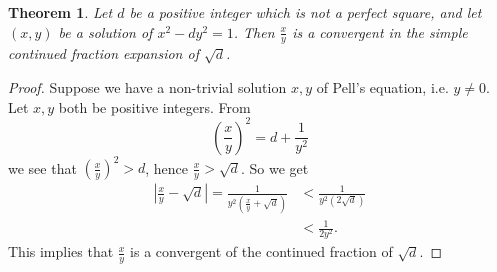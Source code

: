 \documentclass[12pt]{article}
\newtheorem{thm}{Theorem}
\begin{document}
\begin{thm}
Let $d$ be a positive integer which is not a perfect square, and let $(x,y)$ be
a solution of $x^2 -dy^2 =1$. Then $\frac{x}{y}$ is a convergent in the simple
continued fraction expansion of $\sqrt{d}$.
\end{thm}
\begin{proof}
Suppose we have a non-trivial solution $x,y$ of Pell's equation, i.e. $y \neq
0$. Let $x,y$ both be positive integers. From
\[\left(\frac{x}{y}\right)^2 =d +\frac{1}{y^2}\]
we see that $\left(\frac{x}{y}\right)^2 > d$, hence $\frac{x}{y} >
\sqrt{d}$. So we get
\begin{eqnarray*}
\left\vert \frac{x}{y} -\sqrt{d}\right\vert =\frac{1}{y^2\left(\frac{x}{y}
+\sqrt{d}\right)} & < \frac{1}{y^2\left(2\sqrt{d}\right)} \\
& < \frac{1}{2y^2}.
\end{eqnarray*}
This implies that $\frac{x}{y}$ is a convergent of the continued fraction of
$\sqrt{d}$.
\end{proof}
\end{document}
